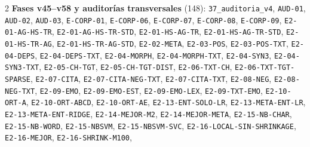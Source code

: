 \begin{multicols}{2}
\noindent\textbf{Fases v45--v58 y auditorías transversales} (148): \texttt{37\_\allowbreak{}auditoria\_\allowbreak{}v4}, \texttt{AUD-\allowbreak{}01}, \texttt{AUD-\allowbreak{}02}, \texttt{AUD-\allowbreak{}03}, \texttt{E-\allowbreak{}CORP-\allowbreak{}01}, \texttt{E-\allowbreak{}CORP-\allowbreak{}06}, \texttt{E-\allowbreak{}CORP-\allowbreak{}07}, \texttt{E-\allowbreak{}CORP-\allowbreak{}08}, \texttt{E-\allowbreak{}CORP-\allowbreak{}09}, \texttt{E2-\allowbreak{}01-\allowbreak{}AG-\allowbreak{}HS-\allowbreak{}TR}, \texttt{E2-\allowbreak{}01-\allowbreak{}AG-\allowbreak{}HS-\allowbreak{}TR-\allowbreak{}STD}, \texttt{E2-\allowbreak{}01-\allowbreak{}HS-\allowbreak{}AG-\allowbreak{}TR}, \texttt{E2-\allowbreak{}01-\allowbreak{}HS-\allowbreak{}AG-\allowbreak{}TR-\allowbreak{}STD}, \texttt{E2-\allowbreak{}01-\allowbreak{}HS-\allowbreak{}TR-\allowbreak{}AG}, \texttt{E2-\allowbreak{}01-\allowbreak{}HS-\allowbreak{}TR-\allowbreak{}AG-\allowbreak{}STD}, \texttt{E2-\allowbreak{}02-\allowbreak{}META}, \texttt{E2-\allowbreak{}03-\allowbreak{}POS}, \texttt{E2-\allowbreak{}03-\allowbreak{}POS-\allowbreak{}TXT}, \texttt{E2-\allowbreak{}04-\allowbreak{}DEPS}, \texttt{E2-\allowbreak{}04-\allowbreak{}DEPS-\allowbreak{}TXT}, \texttt{E2-\allowbreak{}04-\allowbreak{}MORPH}, \texttt{E2-\allowbreak{}04-\allowbreak{}MORPH-\allowbreak{}TXT}, \texttt{E2-\allowbreak{}04-\allowbreak{}SYN3}, \texttt{E2-\allowbreak{}04-\allowbreak{}SYN3-\allowbreak{}TXT}, \texttt{E2-\allowbreak{}05-\allowbreak{}CH-\allowbreak{}TGT}, \texttt{E2-\allowbreak{}05-\allowbreak{}CH-\allowbreak{}TGT-\allowbreak{}DIST}, \texttt{E2-\allowbreak{}06-\allowbreak{}TXT-\allowbreak{}CH}, \texttt{E2-\allowbreak{}06-\allowbreak{}TXT-\allowbreak{}TGT-\allowbreak{}SPARSE}, \texttt{E2-\allowbreak{}07-\allowbreak{}CITA}, \texttt{E2-\allowbreak{}07-\allowbreak{}CITA-\allowbreak{}NEG-\allowbreak{}TXT}, \texttt{E2-\allowbreak{}07-\allowbreak{}CITA-\allowbreak{}TXT}, \texttt{E2-\allowbreak{}08-\allowbreak{}NEG}, \texttt{E2-\allowbreak{}08-\allowbreak{}NEG-\allowbreak{}TXT}, \texttt{E2-\allowbreak{}09-\allowbreak{}EMO}, \texttt{E2-\allowbreak{}09-\allowbreak{}EMO-\allowbreak{}EST}, \texttt{E2-\allowbreak{}09-\allowbreak{}EMO-\allowbreak{}LEX}, \texttt{E2-\allowbreak{}09-\allowbreak{}TXT-\allowbreak{}EMO}, \texttt{E2-\allowbreak{}10-\allowbreak{}ORT-\allowbreak{}A}, \texttt{E2-\allowbreak{}10-\allowbreak{}ORT-\allowbreak{}ABCD}, \texttt{E2-\allowbreak{}10-\allowbreak{}ORT-\allowbreak{}AE}, \texttt{E2-\allowbreak{}13-\allowbreak{}ENT-\allowbreak{}SOLO-\allowbreak{}LR}, \texttt{E2-\allowbreak{}13-\allowbreak{}META-\allowbreak{}ENT-\allowbreak{}LR}, \texttt{E2-\allowbreak{}13-\allowbreak{}META-\allowbreak{}ENT-\allowbreak{}RIDGE}, \texttt{E2-\allowbreak{}14-\allowbreak{}MEJOR-\allowbreak{}M2}, \texttt{E2-\allowbreak{}14-\allowbreak{}MEJOR-\allowbreak{}META}, \texttt{E2-\allowbreak{}15-\allowbreak{}NB-\allowbreak{}CHAR}, \texttt{E2-\allowbreak{}15-\allowbreak{}NB-\allowbreak{}WORD}, \texttt{E2-\allowbreak{}15-\allowbreak{}NBSVM}, \texttt{E2-\allowbreak{}15-\allowbreak{}NBSVM-\allowbreak{}SVC}, \texttt{E2-\allowbreak{}16-\allowbreak{}LOCAL-\allowbreak{}SIN-\allowbreak{}SHRINKAGE}, \texttt{E2-\allowbreak{}16-\allowbreak{}MEJOR}, \texttt{E2-\allowbreak{}16-\allowbreak{}SHRINK-\allowbreak{}M100}, 
\end{multicols}
